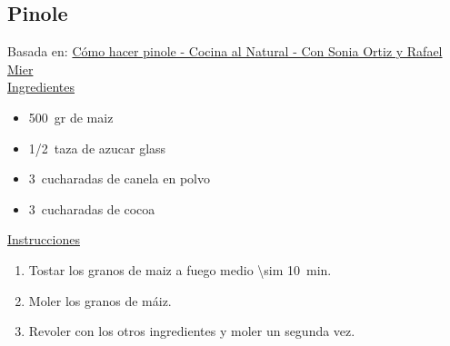 \subsection{Pinole}

Basada en: \href{https://www.youtube.com/watch?v=ay2mmB5-18g}{Cómo hacer pinole - Cocina al Natural - Con Sonia Ortiz y Rafael Mier} \\

\underline{Ingredientes}

\begin{itemize}
\item \SI{500}{gr} de maiz
\item \SI{1/2}{taza} de azucar glass
\item \SI{3}{cucharadas} de canela en polvo
\item \SI{3}{cucharadas} de cocoa
\end{itemize}


\underline{Instrucciones}

\begin{enumerate}
\item Tostar los granos de maiz a fuego medio \SI{\sim 10}{min}.
\item Moler los granos de máiz.
\item Revoler con los otros ingredientes y moler un segunda vez.
\end{enumerate}

